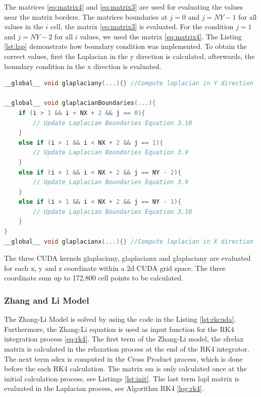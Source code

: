  The matrices \ref{eq:matrix4} and \ref{eq:matrix3} are used for evaluating the values near the matrix borders. The matrices boundaries at $j = 0$ and $j = NY - 1$ for all values in the $i$ cell, the matrix \ref{eq:matrix3} is evaluated. For the condition $j = 1$ and $j = NY - 2$ for all $i$ values, we used the matrix \ref{eq:matrix4}. The Listing \ref{lst:lap} demonstrate how boundary condition was implemented. To obtain the correct values, first the Laplacian in the y direction is calculated, afterwards, the boundary condition in the x direction is evaluated.

\begin{lstlisting}[language=C++, label={lst:lap}, caption={Evaluation of Laplacian X, Y with boundary condition}]
__global__ void glaplaciany(...){} //Compute laplacian in Y direction

__global__ void glaplacianBoundaries(...){
    if (i > 1 && i < NX + 2 && j == 0){
     	// Update Laplacian Boundaries Equation 3.10
    }
    else if (i > 1 && i < NX + 2 && j == 1){
  		// Update Laplacian Boundaries Equation 3.9
    }
    else if (i > 1 && i < NX + 2 && j == NY - 2){
        // Update Laplacian Boundaries Equation 3.9
    }
    else if (i > 1 && i < NX + 2 && j == NY - 1){
        // Update Laplacian Boundaries Equation 3.10
    }
}
__global__ void glaplacianx(...){} //Compute laplacian in X direction
\end{lstlisting}

The three CUDA kernels {\listf glaplaciany}, {\listf glaplacianx} and {\listf glaplaciany} are evaluated for each x, y and z coordinate within a 2d CUDA grid space. The three coordinate sum up to 172,800 cell points to be calculated.

\subsubsection{Zhang and Li Model}

The Zhang-Li Model is solved by using the code in the Listing \ref{lst:rkcuda}. Furthermore, the Zhang-Li equation is used as input function for the RK4 integration process \ref{eq:rk4}. The first term of the Zhang-Li model, the {\listf sfrelax} matrix is calculated in the relaxation process at the end of the RK4 integrator. The next term {\listf sdex} is computed in the Cross Product process, which is done before the each RK4 calculation. The matrix {\listf sm} is only calculated once at the initial calculation process, see Listings \ref{lst:init}. The last term {\listf lapl} matrix is evaluated in the Laplacian process, see Algorithm RK4 \ref{log:rk4}.

